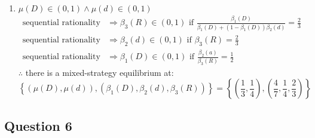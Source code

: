 \documentclass{article}
\begin{document}
\begin{enumerate}
	\item $\mu(D)\in(0,1)\land \mu(d)\in(0,1)$
		\begin{align*}
			\text{sequential rationality} 	&\Rightarrow \beta_3(R)\in(0,1) \text{ if } \frac{\beta_1(D)}{\beta_1(D) + (1-\beta_1(D))\beta_2(d)}= \frac{2}{3}\\
			\text{sequential rationality} 	&\Rightarrow \beta_2(d)\in(0,1)	\text{ if } \beta_3(R)=\frac{2}{3} \\
			\text{sequential rationality} 	&\Rightarrow \beta_1(D)\in(0,1)	\text{ if } \frac{\beta_2(a)}{\beta_3(R)}=\frac{1}{2}	
		\end{align*}
		$\therefore$ there is a mixed-strategy equilibrium at:
		\[
			\left\{\left(\mu(D),\mu(d)\right),\left(\beta_1(D),\beta_2(d),\beta_3(R)\right)\right\} 
				= \left\{\left(\frac{1}{3},\frac{1}{4}\right),\left(\frac{4}{7},\frac{1}{4},\frac{2}{3}\right)\right\}
		\]
\end{enumerate}






\subsection*{Question 6}


	


\end{document}
